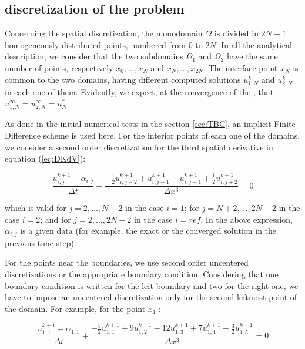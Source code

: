\subsection{ discretization of the problem}

\indent Concerning the spatial discretization, the monodomain $\Omega$ is divided in $2N + 1$ homogeneously distributed points, numbered from $0$ to $2N$. In all the analytical description, we consider that the two subdomains $\Omega_1$ and $\Omega_2$ have the same number of points, respectively $x_0,...,x_N$ and $x_N,...,x_{2N}$. The interface point $x_N$ is common to the two domains, having different computed solutions $u_{1,N}^k$ and $u_{2,N}^k$ in each one of them. Evidently, we expect, at the convergence of the , that $u_{1,N}^\infty = u_{2,N}^\infty = u_N^*$

\indent As done in the initial numerical tests in the section \ref{sec:TBC}, an implicit Finite Difference scheme is used here. For the interior points of each one of the domains, we consider a second order discretization for the third spatial derivative in equation (\ref{eq:DKdV}):

\begin{equation}
    \label{eq:FDdiscretization}
    \frac{u^{k+1}_{i,j} - \alpha_{i,j}}{\Delta t} + \frac{-\frac{1}{2}u_{i,j-2}^{k+1} + u_{i,j-1}^{k+1} - u_{i,j+1}^{k+1} + \frac{1}{2}u_{i,j+2}^{k+1} }{\Delta x ^3} = 0
\end{equation}

\noindent which is valid for $j=2,...,N-2$ in the case $i=1$; for $j=N+2,...,2N-2$ in the case $i=2$; and for $j=2,...,2N-2$ in the case $i=ref$. In the above expression, $\alpha_{i,j}$ is a given data (for example, the exact or the converged solution in the previous time step).

\indent For the points near the boundaries, we use second order uncentered discretizations or the appropriate boundary condition. Considering that one boundary condition is written for the left boundary and two for the right one, we have to impose an uncentered discretization only for the second leftmost point of the domain. For example, for the point $x_1$ : 

\begin{equation*}
    \frac{u_{1,1}^{k+1} - \alpha_{1,1}}{\Delta t} + \frac{-\frac{5}{2}u_{1,1}^{k+1} + 9u_{1,2}^{k+1} - 12 u_{1,3}^{k+1} + 7 u_{1,4}^{k+1} -\frac{3}{2}u_{1,5}^{k+1}}{\Delta x ^3} = 0
\end{equation*}

